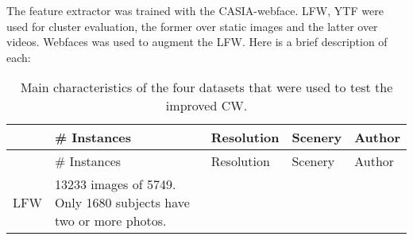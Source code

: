 \documentclass[17pt,]{extarticle}
\begin{document}
The feature extractor was trained with the CASIA-webface. LFW, YTF were used for cluster evaluation, the former over static images and the latter over videos. Webfaces was used to augment the LFW. Here is a brief description of each:

\small

\begin{longtable}[]{@{}lllll@{}}
\caption{\label{tab:table1} Main characteristics of the four datasets that were used to test the improved CW.}\tabularnewline
\toprule
\begin{minipage}[b]{0.09\columnwidth}\raggedright
\strut
\end{minipage} & \begin{minipage}[b]{0.24\columnwidth}\raggedright
\# Instances\strut
\end{minipage} & \begin{minipage}[b]{0.14\columnwidth}\raggedright
Resolution\strut
\end{minipage} & \begin{minipage}[b]{0.19\columnwidth}\raggedright
Scenery\strut
\end{minipage} & \begin{minipage}[b]{0.20\columnwidth}\raggedright
Author\strut
\end{minipage}\tabularnewline
\midrule
\endfirsthead
\toprule
\begin{minipage}[b]{0.09\columnwidth}\raggedright
\strut
\end{minipage} & \begin{minipage}[b]{0.24\columnwidth}\raggedright
\# Instances\strut
\end{minipage} & \begin{minipage}[b]{0.14\columnwidth}\raggedright
Resolution\strut
\end{minipage} & \begin{minipage}[b]{0.19\columnwidth}\raggedright
Scenery\strut
\end{minipage} & \begin{minipage}[b]{0.20\columnwidth}\raggedright
Author\strut
\end{minipage}\tabularnewline
\midrule
\endhead
\begin{minipage}[t]{0.09\columnwidth}\raggedright
LFW\strut
\end{minipage} & \begin{minipage}[t]{0.24\columnwidth}\raggedright
13233 images of 5749. Only 1680 subjects have two or more photos.\strut
\end{minipage} & \begin{minipage}[t]{0.14\columnwidth}\raggedright

\end{minipage}
\end{longtable}
\end{document}
